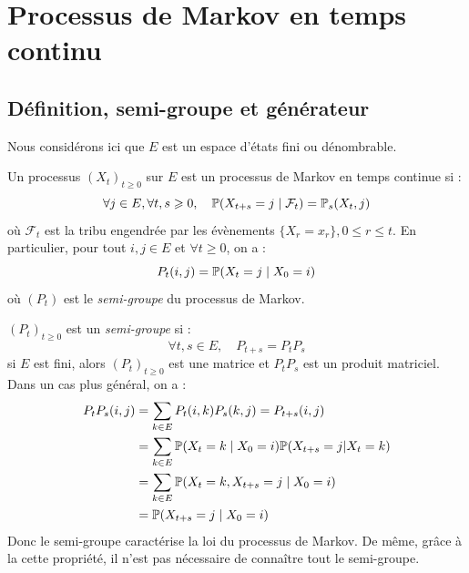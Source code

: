 
\section{Processus de Markov en temps continu}

\subsection{Définition, semi-groupe et générateur}

Nous considérons ici que $E$ est un espace d'états fini ou dénombrable. 

\begin{definition}
    Un processus $(X_t)_{t \geqslant 0}$ sur $E$ est un processus de Markov en temps continue si : 
        $$ \forall j \in E, \forall t,s \geqslant 0, \quad \mathbb{P}(X_{t+s} = j \mid \mathcal{F}_t ) = \mathbb{P}_s(X_t, j) $$
    où $ \mathcal{F}_t$ est la tribu engendrée par les évènements $ \{X_r = x_r\}, 0 \leqslant r \leqslant t$. 
    En particulier, pour tout $i,j \in E$ et $ \forall t \geqslant 0$, on a : 
        $$ P_t(i,j) = \mathbb{P}(X_t = j \mid X_0 = i) $$
    où $(P_t)$ est le \emph{semi-groupe} du processus de Markov.
\end{definition}

\begin{prop}
    $(P_t)_{t \geqslant 0}$ est un \emph{semi-groupe} si : 
        $$ \forall t,s \in E, \quad P_{t+s} = P_t P_s $$
    si $E$ est fini, alors $(P_t)_{t \geqslant 0}$ est une matrice et $ P_t P_s$ est un produit matriciel. 
    Dans un cas plus général, on a : 
        \begin{align*}
            P_t P_s (i,j) &= \sum_{k \in E} P_t(i,k) P_s(k,j) = P_{t + s}(i,j) \\ 
            &= \sum_{k \in E} \mathbb{P}(X_t = k \mid X_0 = i) \mathbb{P}(X_{t + s} = j | X_t = k) \\ 
            &= \sum_{k \in E} \mathbb{P}(X_t = k, X_{t+s} = j \mid X_0 = i) \\
            &= \mathbb{P}(X_{t+s} = j \mid X_0 = i)    
        \end{align*}
    Donc le semi-groupe caractérise la loi du processus de Markov. De même, grâce à la cette propriété, il n'est 
    pas nécessaire de connaître tout le semi-groupe. 
\end{prop}

